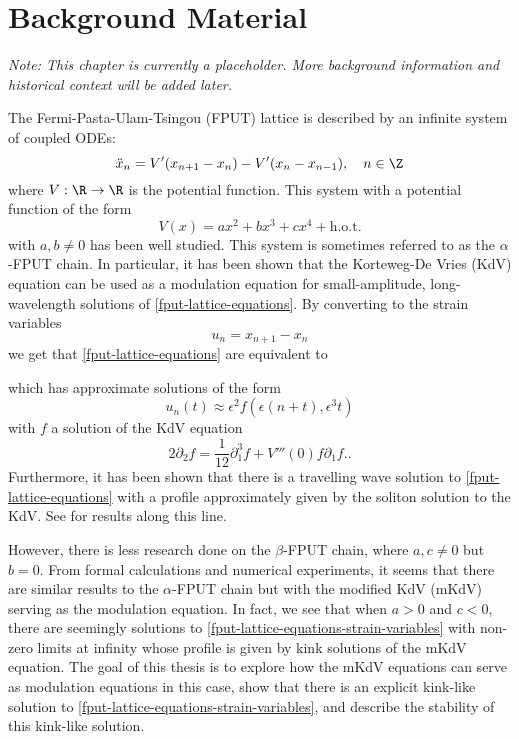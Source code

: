 \chapter{Background Material}

\emph{Note: This chapter is currently a placeholder. More background information and historical context will be added later.}

The Fermi-Pasta-Ulam-Tsingou (FPUT) lattice is described by an infinite system of coupled ODEs:
\begin{equation}\label{fput-lattice-odes}
	\ddot x_n = V'(x_{n+1} - x_n) - V'(x_n - x_{n-1}), \quad n \in \Z
\end{equation}
where \(V:\R\to \R\) is the potential function. This system with a potential function of the form
\begin{equation}
	V(x) = a x^2 + b x^3 + c x^4 + \mathrm{h.o.t.}
\end{equation} 
with \(a,b\neq 0\) has been well studied. This system is sometimes referred to as the \(\alpha\)-FPUT chain. In particular, it has been shown that the Korteweg-De Vries (KdV) equation can be used as a modulation equation for small-amplitude, long-wavelength solutions of \cref{fput-lattice-equations}. By converting to the strain variables
\begin{equation*}
	u_n = x_{n+1} - x_n
\end{equation*}
we get that \cref{fput-lattice-equations} are equivalent to 

which has approximate solutions of the form
\begin{equation}
	u_n(t) \approx \epsilon^2 f(\epsilon (n+t),\epsilon^3 t)
\end{equation}
with \(f\) a solution of the KdV equation
\begin{equation*}
	2 \partial_2 f = \frac 1 {12} \partial_1^3 f  + {V'''(0)} f \partial_1 f..
\end{equation*}
Furthermore, it has been shown that there is a travelling wave solution to \cref{fput-lattice-equations} with a profile approximately given by the soliton solution to the KdV. See \cite{schneider2000counter,friesecke1999solitary,khan2017long} for results along this line.

However, there is less research done on the \(\beta\)-FPUT chain, where \(a, c\neq 0\) but \(b = 0\). From formal calculations and numerical experiments, it seems that there are similar results to the \(\alpha\)-FPUT chain but with the modified KdV (mKdV) serving as the modulation equation. In fact, we see that when \(a> 0\) and \(c< 0\), there are seemingly solutions to \cref{fput-lattice-equations-strain-variables} with non-zero limits at infinity whose profile is given by kink solutions of the mKdV equation. The goal of this thesis is to explore how the mKdV equations can serve as modulation equations in this case, show that there is an explicit kink-like solution to \cref{fput-lattice-equations-strain-variables}, and describe the stability of this kink-like solution.

